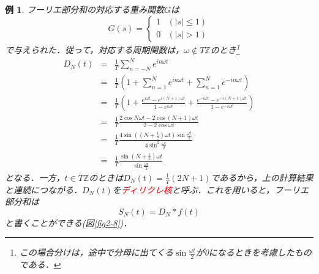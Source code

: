 \documentclass[a4j]{jsbook}
\newtheorem{example}[theorem]{例}
\numberwithin{theorem}{chapter}  %
\begin{document}
\begin{example} 
\label{ex2-7}
フーリエ部分和の対応する重み関数\(G\)は
\begin{equation*}
    G(s)=
    \begin{cases}
    1 & (|s|\leq 1) \\
    0 & (|s|>1)
    \end{cases}
\end{equation*}
で与えられた．従って，対応する周期関数は，\(\omega\notin T\mathbb{Z}\)のとき\footnote{この場合分けは，途中で分母に出てくる\(\displaystyle\sin\frac{\omega t}{2}\)が0になるときを考慮したものである．}
\begin{eqnarray*}
D_N(t)&=&\frac{1}{T}\sum_{n=-N}^N e^{in\omega t} \\
&=&\frac{1}{T}\left(1+\sum_{n=1}^N e^{in\omega t}+\sum_{n=1}^N e^{-in\omega t}\right) \\
&=&\frac{1}{T}\left(1+\frac{e^{i\omega t}-e^{i(N+1)\omega t}}{1-e^{i\omega t}}+\frac{e^{-i\omega t}-e^{-i(N+1)\omega t}}{1-e^{-i\omega t}}\right) \\
&=&\frac{1}{T}\frac{2\cos N\omega t-2\cos(N+1)\omega t}{2-2\cos\omega t} \\
&=&\frac{1}{T}\frac{4\sin\left(\left(N+\frac{1}{2}\right)\omega t\right)\sin\frac{\omega t}{2}}{4\sin^2\frac{\omega t}{2}} \\
&=&\frac{1}{T}\frac{\sin\left(N+\frac{1}{2}\right)\omega t}{\sin\frac{\omega t}{2}}
\end{eqnarray*}
となる．一方，\(t\in T\mathbb{Z}\)のときは\(\displaystyle D_N(t)=\frac{1}{T}(2N+1)\)であるから，上の計算結果と連続につながる．\(D_N(t)\)を\textcolor{red}{ディリクレ核}と呼ぶ．これを用いると，フーリエ部分和は
\begin{equation*}
    S_N(t)=D_N*f(t)
\end{equation*}
と書くことができる(図\ref{fig2-8})．
\begin{figure}
    \centering

\end{figure}
\end{example}
\end{document}
